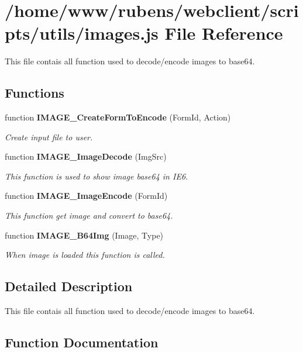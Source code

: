 \section{/home/www/rubens/webclient/scripts/utils/images.js File Reference}
\label{images_8js}
This file contais all function used to decode/encode images to base64. 

\subsection*{Functions}
\begin{CompactItemize}
\item 
function {\bf IMAGE\_\-CreateFormToEncode} (FormId, Action)
\begin{CompactList}\small\item\em Create input file to user. \item\end{CompactList}\item 
function {\bf IMAGE\_\-ImageDecode} (ImgSrc)
\begin{CompactList}\small\item\em This function is used to show image base64 in IE6. \item\end{CompactList}\item 
function {\bf IMAGE\_\-ImageEncode} (FormId)
\begin{CompactList}\small\item\em This function get image and convert to base64. \item\end{CompactList}\item 
function {\bf IMAGE\_\-B64Img} (Image, Type)
\begin{CompactList}\small\item\em When image is loaded this function is called. \item\end{CompactList}\end{CompactItemize}


\subsection{Detailed Description}
This file contais all function used to decode/encode images to base64. 



\subsection{Function Documentation}
